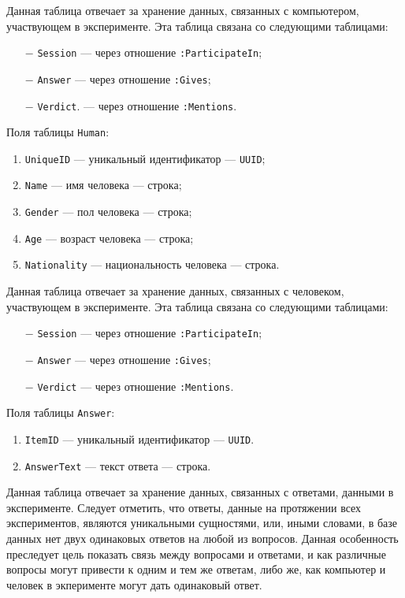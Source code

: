Данная таблица отвечает за хранение данных, связанных с компьютером, участвующем в эксперименте. 
Эта таблица связана со следующими таблицами:
\begin{itemize}
    \item[$-$] \texttt{Session} --- через отношение \texttt{:ParticipateIn};
    \item[$-$] \texttt{Answer} --- через отношение \texttt{:Gives};
    \item[$-$] \texttt{Verdict}. --- через отношение \texttt{:Mentions}.
\end{itemize}

Поля таблицы \texttt{Human}:
\begin{enumerate}
    \item \texttt{UniqueID} --- уникальный идентификатор --- \texttt{UUID};  
    \item \texttt{Name} --- имя человека --- строка;
    \item \texttt{Gender} --- пол человека --- строка;
    \item \texttt{Age} --- возраст человека --- строка; 
    \item \texttt{Nationality} --- национальность человека --- строка.
\end{enumerate}

Данная таблица отвечает за хранение данных, связанных с человеком, участвующем в эксперименте. 
Эта таблица связана со следующими таблицами:
\begin{itemize}
    \item[$-$] \texttt{Session} --- через отношение \texttt{:ParticipateIn};
    \item[$-$] \texttt{Answer} --- через отношение \texttt{:Gives};
    \item[$-$] \texttt{Verdict} --- через отношение \texttt{:Mentions}.
\end{itemize}

Поля таблицы \texttt{Answer}:
\begin{enumerate}
    \item \texttt{ItemID} --- уникальный идентификатор --- \texttt{UUID}.
    \item \texttt{AnswerText} --- текст ответа --- строка.
\end{enumerate}

Данная таблица отвечает за хранение данных, связанных с ответами, данными в эксперименте. 
Следует отметить, что ответы, данные на протяжении всех экспериментов, являются уникальными сущностями, или, иными словами, в базе данных нет двух одинаковых ответов на любой из вопросов.
Данная особенность преследует цель показать связь между вопросами и ответами, и как различные вопросы могут привести к одним и тем же ответам, либо же, как компьютер и человек в экперименте могут дать одинаковый ответ.

